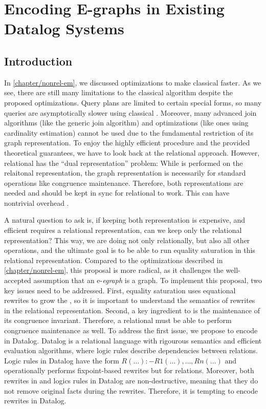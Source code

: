 \chapter{Encoding E-graphs in Existing Datalog Systems}

\section{Introduction}

In \autoref{chapter/nonrel-em},
 we discussed optimizations to make classical \ematching faster. 
As we see, there are still many limitations to the classical \ematching algorithm
 despite the proposed optimizations.
Query plans are limited to certain special forms,
 so many queries are asymptotically slower using classical \ematching.
Moreover,
 many advanced join algorithms (like the generic join algorithm) 
 and optimizations (like ones using cardinality estimation) cannot be used
 due to the fundamental restriction of its graph representation.
To enjoy the highly efficient \ematching procedure and the provided theoretical guarantees,
 we have to look back at the relational \ematching approach.
However,
 relational \ematching has the ``dual representation'' problem:
While \ematching is performed on the relaitonal representation,
 the graph representation is necessarily for standard \egraph operations
 like congruence maintenance.
Therefore,
 both representations are needed and should be kept in sync
 for relational \ematching to work.
This can have nontrivial overhead \citep{relational-ematching}.

A natural question to ask is, 
 if keeping both representation is expensive, 
 and efficient \ematching requires a relational representation,
 can we keep only the relational representation?
This way, 
 we are doing not only \ematching relationally,
 but also all other \egraph operations,
 and the ultimate goal is to be able to run equality saturation
 in this relational representation.
Compared to the optimizations described in \autoref{chapter/nonrel-em},
 this proposal is more radical,
 as it challenges the well-accepted assumption that an e-\textit{egraph} is a graph.
To implement this proposal, two key issues need to be addressed.
First,
 equality saturation uses equational rewrites to grow the \egraph,
 so it is important to understand the semantics of rewrites 
 in the relational representation.
Second,
 a key ingredient to \egraphs is the maintenance of its congruence invariant.
Therefore,
 a relational \egraph must be able to perform congruence maintenance as well.
To address the first issue, 
 we propose to encode \egraphs in Datalog.
Datalog is a relational language with rigourous semantics and efficient evaluation algorithms,
 where logic rules describe dependencies between relations.
Logic rules in Datalog have the form $R(\ldots) :- R1(\ldots),\ldots,Rn(\ldots)$ and
 operationally performs fixpoint-based rewrites but for relations.
Moreover, both rewrites in \egraphs and logics rules in Datalog are non-destructive,
 meaning that they do not remove original facts during the rewrites.
Therefore,
 it is tempting to encode \egraph rewrites in Datalog.

